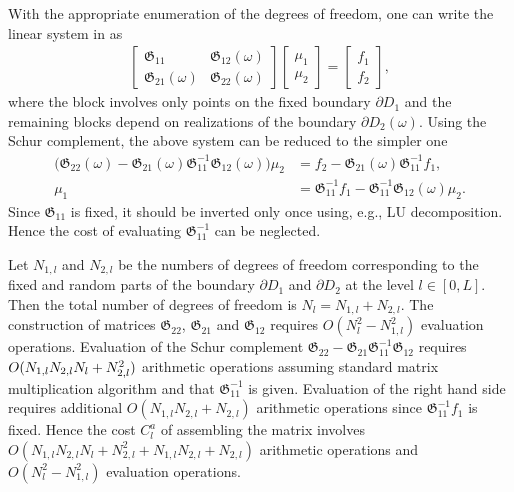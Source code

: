 With the appropriate enumeration of the degrees of freedom, one can write the linear system in \change{\eqref{eq:lin_system_final}} as
\begin{align*}
	\begin{bmatrix}
    	\boldsymbol{\mathfrak{G}}_{11} & \boldsymbol{\mathfrak{G}}_{12}(\omega)
        \\
        \boldsymbol{\mathfrak{G}}_{21}(\omega) & \boldsymbol{\mathfrak{G}}_{22}(\omega) 
    \end{bmatrix}
    \begin{bmatrix}
    	\mu_1
        \\
        \mu_2
    \end{bmatrix}
    =
    \begin{bmatrix}
    	f_1
        \\
        f_2
    \end{bmatrix},
\end{align*}
where the block  involves only points on the fixed boundary $\partial D_1$ and the remaining blocks depend on realizations of the boundary $\partial D_2(\omega)$.
Using the Schur complement, the above system can be reduced to the simpler one
\begin{align}\label{eq:lin_system_Schur}
	\Big( \boldsymbol{\mathfrak{G}}_{22}(\omega) - \boldsymbol{\mathfrak{G}}_{21}(\omega) \boldsymbol{\mathfrak{G}}_{11}^{-1} \boldsymbol{\mathfrak{G}}_{12}(\omega) \Big) \mu_2 &= f_2 - \boldsymbol{\mathfrak{G}}_{21}(\omega) \boldsymbol{\mathfrak{G}}_{11}^{-1} f_1,
    \\
    \mu_1 &= \boldsymbol{\mathfrak{G}}_{11}^{-1} f_1 - \boldsymbol{\mathfrak{G}}_{11}^{-1} \boldsymbol{\mathfrak{G}}_{12}(\omega) \mu_2.
\end{align}
Since $\boldsymbol{\mathfrak{G}}_{11}$ is fixed, it should be inverted only once using, e.g., LU decomposition.
Hence the cost of evaluating $\boldsymbol{\mathfrak{G}}_{11}^{-1}$ can be neglected.

Let $N_{1,l}$ and $N_{2,l}$ be the numbers of degrees of freedom corresponding to the fixed and random parts of the boundary $\partial D_1$ and $\partial D_2$ at the level $l \in [0,L]$.
Then the total number of degrees of freedom is $N_l=N_{1,l}+N_{2,l}$.
The construction of matrices $\boldsymbol{\mathfrak{G}}_{22}$, $\boldsymbol{\mathfrak{G}}_{21}$ and $\boldsymbol{\mathfrak{G}}_{12}$ requires $O(N_l^2-N_{1,l}^2)$ evaluation operations.
Evaluation of the Schur complement $\boldsymbol{\mathfrak{G}}_{22} - \boldsymbol{\mathfrak{G}}_{21} \boldsymbol{\mathfrak{G}}_{11}^{-1} \boldsymbol{\mathfrak{G}}_{12}$ requires $O( N_{1,l} N_{2,l} N_{l} + N_{2,l}^2)$ arithmetic operations assuming standard matrix multiplication algorithm and that $\boldsymbol{\mathfrak{G}}_{11}^{-1}$ is given.
Evaluation of the right hand side requires additional $O(N_{1,l}N_{2,l} + N_{2,l})$ arithmetic operations since $\boldsymbol{\mathfrak{G}}_{11}^{-1} f_1$ is fixed. 
Hence the cost $C_l^a $ of assembling the matrix involves $O(N_{1,l} N_{2,l} N_{l} + N_{2,l}^2 + N_{1,l}N_{2,l} + N_{2,l})$ arithmetic operations and $O(N_l^2-N_{1,l}^2)$ evaluation operations. 


